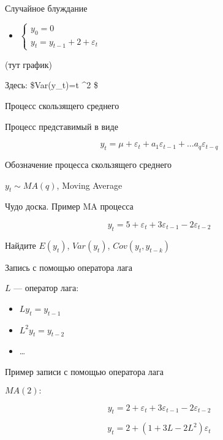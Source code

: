 \documentclass[ignorenonframetext,]{beamer}
\begin{document}
\begin{frame}{Случайное блуждание}

\begin{itemize}
\itemsep1pt\parskip0pt
\item
  $\begin{cases} y_0 = 0 \\ y_t = y_{t-1} + 2 + \varepsilon_t \end{cases}$
\end{itemize}

(тут график)

Здесь: \$Var(y\_t)=t \sigma\^{}2 \$

\end{frame}

\begin{frame}{Процесс скользящего среднего}

Процесс представимый в виде

\[
y_t= \mu + \varepsilon_t + a_1 \varepsilon_{t-1} + \ldots a_q \varepsilon_{t-q}
\]

\end{frame}

\begin{frame}{Обозначение процесса скользящего среднего}

$y_t \sim MA(q)$, Moving Average

\end{frame}

\begin{frame}{Чудо доска. Пример MA процесса}

\[
y_t = 5 + \varepsilon_t + 3 \varepsilon_{t-1} -2\varepsilon_{t-2}
\]

Найдите $E(y_t)$, $Var(y_t)$, $Cov(y_t,y_{t-k})$

\end{frame}

\begin{frame}{Запись с помощью оператора лага}

$L$ --- оператор лага:

\begin{itemize}
\item
  $Ly_t=y_{t-1}$
\item
  $L^2y_t=y_{t-2}$
\item
  \ldots
\end{itemize}

\end{frame}

\begin{frame}{Пример записи с помощью оператора лага}

$MA(2):$

\[
y_t= 2 + \varepsilon_t + 3\varepsilon_{t-1}-2\varepsilon_{t-2}
\]

\[
y_t= 2 +(1+3L-2L^2)\varepsilon_t
\]

\end{frame}
\end{document}
